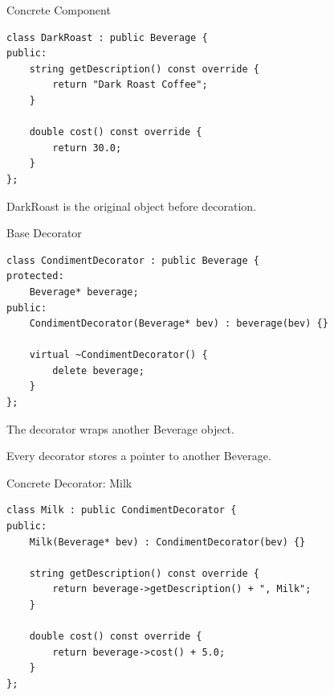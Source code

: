\documentclass[aspectratio=169]{beamer}
\begin{document}

\begin{frame}[fragile]{Concrete Component}

\begin{lstlisting}
class DarkRoast : public Beverage {
public:
    string getDescription() const override {
        return "Dark Roast Coffee";
    }

    double cost() const override {
        return 30.0;
    }
};
\end{lstlisting}

\pause

DarkRoast is the original object before decoration.

\end{frame}


\begin{frame}[fragile]{Base Decorator}

\begin{lstlisting}
class CondimentDecorator : public Beverage {
protected:
    Beverage* beverage;
public:
    CondimentDecorator(Beverage* bev) : beverage(bev) {}

    virtual ~CondimentDecorator() {
        delete beverage;
    }
};
\end{lstlisting}

\pause
The decorator wraps another Beverage object.

Every decorator stores a pointer to another Beverage.

\end{frame}

\begin{frame}[fragile]{Concrete Decorator: Milk}

\begin{lstlisting}
class Milk : public CondimentDecorator {
public:
    Milk(Beverage* bev) : CondimentDecorator(bev) {}

    string getDescription() const override {
        return beverage->getDescription() + ", Milk";
    }

    double cost() const override {
        return beverage->cost() + 5.0;
    }
};
\end{lstlisting}

\pause

\end{frame}
\end{document}
